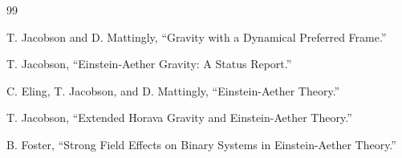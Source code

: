 
\begin{thebibliography}{99}

T. Jacobson and D. Mattingly,
``Gravity with a Dynamical Preferred Frame.''

T. Jacobson,
``Einstein-Aether Gravity: A Status Report.''

C. Eling, T. Jacobson, and D. Mattingly,
``Einstein-Aether Theory.''

T. Jacobson,
``Extended Horava Gravity and Einstein-Aether Theory.''

B. Foster,
``Strong Field Effects on Binary Systems in Einstein-Aether Theory.''

\end{thebibliography}

